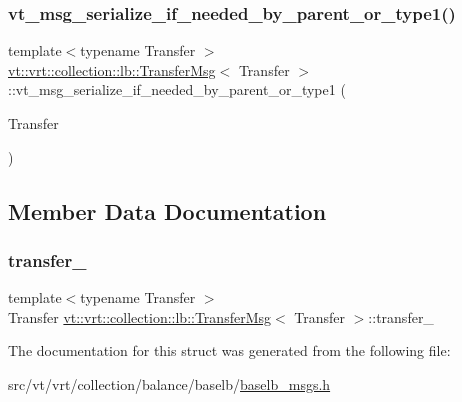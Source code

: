 \subsubsection{\texorpdfstring{vt\+\_\+msg\+\_\+serialize\+\_\+if\+\_\+needed\+\_\+by\+\_\+parent\+\_\+or\+\_\+type1()}{vt\_msg\_serialize\_if\_needed\_by\_parent\_or\_type1()}}
{\footnotesize\ttfamily template$<$typename Transfer $>$ \\
\hyperlink{structvt_1_1vrt_1_1collection_1_1lb_1_1_transfer_msg}{vt\+::vrt\+::collection\+::lb\+::\+Transfer\+Msg}$<$ Transfer $>$\+::vt\+\_\+msg\+\_\+serialize\+\_\+if\+\_\+needed\+\_\+by\+\_\+parent\+\_\+or\+\_\+type1 (\begin{DoxyParamCaption}\item[{Transfer}]{ }\end{DoxyParamCaption})}



\subsection{Member Data Documentation}
\mbox{\label{structvt_1_1vrt_1_1collection_1_1lb_1_1_transfer_msg_ab8a2aefc116dd5d0fc06e6aa722ce0ef}} 
\subsubsection{\texorpdfstring{transfer\+\_\+}{transfer\_}}
{\footnotesize\ttfamily template$<$typename Transfer $>$ \\
Transfer \hyperlink{structvt_1_1vrt_1_1collection_1_1lb_1_1_transfer_msg}{vt\+::vrt\+::collection\+::lb\+::\+Transfer\+Msg}$<$ Transfer $>$\+::transfer\+\_\+\hspace{0.3cm}{\ttfamily [private]}}



The documentation for this struct was generated from the following file\+:\begin{DoxyCompactItemize}
\item 
src/vt/vrt/collection/balance/baselb/\hyperlink{baselb__msgs_8h}{baselb\+\_\+msgs.\+h}\end{DoxyCompactItemize}
